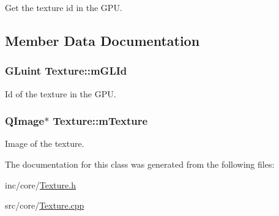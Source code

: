 Get the texture id in the G\+P\+U. 



\subsection{Member Data Documentation}
\hypertarget{class_texture_ac7dad9160f7c8335c4e04f6b55b2f66d}{
\subsubsection[{m\+G\+L\+Id}]{\setlength{\rightskip}{0pt plus 5cm}G\+Luint Texture\+::m\+G\+L\+Id\hspace{0.3cm}{\ttfamily [private]}}}\label{class_texture_ac7dad9160f7c8335c4e04f6b55b2f66d}


Id of the texture in the G\+P\+U. 

\hypertarget{class_texture_ad7a2196e87052cd1eed2e8574938e6ba}{
\subsubsection[{m\+Texture}]{\setlength{\rightskip}{0pt plus 5cm}Q\+Image$\ast$ Texture\+::m\+Texture\hspace{0.3cm}{\ttfamily [private]}}}\label{class_texture_ad7a2196e87052cd1eed2e8574938e6ba}


Image of the texture. 



The documentation for this class was generated from the following files\+:\begin{DoxyCompactItemize}
\item 
inc/core/\hyperlink{_texture_8h}{Texture.\+h}\item 
src/core/\hyperlink{_texture_8cpp}{Texture.\+cpp}\end{DoxyCompactItemize}
